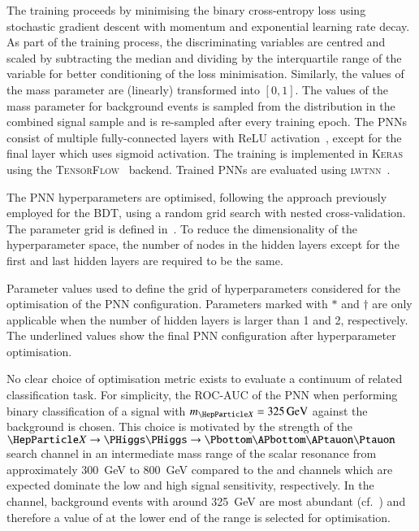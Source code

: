The training proceeds by minimising the binary cross-entropy loss using
stochastic gradient descent with momentum and exponential learning rate
decay. As part of the training process, the discriminating variables are centred
and scaled by subtracting the median and dividing by the interquartile range of
the variable for better conditioning of the loss minimisation. Similarly, the
values of the mass parameter are (linearly) transformed into $[0, 1]$. The
values of the mass parameter for background events is sampled from the \mX
distribution in the combined signal sample and is re-sampled after every
training epoch. The PNNs consist of multiple fully-connected layers with ReLU
activation~\cite{nair:relu}, except for the final layer which uses sigmoid
activation. The training is implemented in \textsc{Keras}~\cite{keras} using the
\textsc{TensorFlow}~\cite{tensorflow2015-whitepaper} backend. Trained PNNs are
evaluated using \textsc{lwtnn}~\cite{lwtnn}.

The PNN hyperparameters are optimised, following the approach
previously employed for the BDT, using a random grid search with
nested cross-validation. The parameter grid is defined
in~. To reduce the dimensionality of
the hyperparameter space, the number of nodes in the hidden layers
except for the first and last hidden layers are required to be the
same.

\begin{table}[htbp]
  \centering

  \caption[Hyperparameter values of the PNN extracting the resonant \HH signals
  in the \hadhad channel.]{Parameter values used to define the grid of
    hyperparameters considered for the optimisation of the PNN
    configuration. Parameters marked with $*$ and $\dagger$ are only applicable
    when the number of hidden layers is larger than 1 and 2, respectively. The
    underlined values show the final PNN configuration after hyperparameter
    optimisation.}%
  \label{tab:hyperparameter_grid_pnn}

  
\end{table}

No clear choice of optimisation metric exists to evaluate a continuum of related
classification task. For simplicity, the ROC-AUC of the PNN when performing
binary classification of a signal with $\mX = \SI{325}{\GeV}$ against the
background is chosen. This choice is motivated by the strength of the
$\PX \to \HH \to \bbtautau$ search channel in an intermediate mass range of the
scalar resonance from approximately \SI{300}{\GeV} to \SI{800}{\GeV} compared to
the \bbyy and \bbbb channels which are expected dominate the low and high \mX
signal sensitivity, respectively. In the \hadhad channel, background events with
\mHH around \SI{325}{\GeV} are most abundant (cf.~) and
therefore a value of \mX at the lower end of the range is selected for
optimisation.

